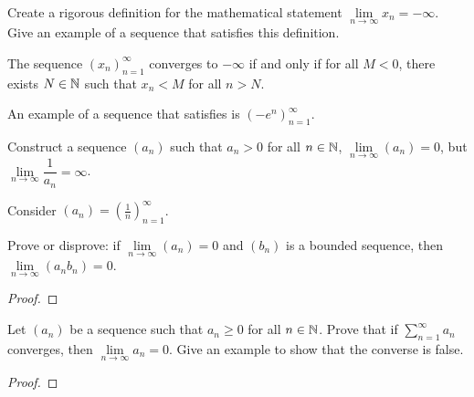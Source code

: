 \begin{problem}
  Create a rigorous definition for the mathematical statement 
  $\lim\limits_{n \to \infty} x_{n} = -\infty$. Give an example of a 
  sequence that satisfies this definition. 

    \begin{definition}
      \label{def:convergence-to-neg-infty}
      The sequence $(x_{n})_{n=1}^{\infty}$ converges to $-\infty$ if and only if
      for all $M < 0$, there exists $N \in \mathbb{N}$ such that $x_{n} < M$ 
      for all $n > N$.
    \end{definition}

    An example of a sequence that satisfies  is
    $(-e^{n})_{n=1}^{\infty}$.
\end{problem}

\begin{problem}
  Construct a sequence $(a_{n})$ such that $a_{n} > 0$ for all $n \in \mathbb{N}$,
  $\lim\limits_{n \to \infty} (a_{n}) = 0$, but
  $\lim\limits_{n \to \infty} \dfrac{1}{a_{n}} = \infty$.

  \vspace{\baselineskip}

    Consider $(a_{n}) = \left( \frac{1}{n} \right)_{n=1}^{\infty}$.

\end{problem}

\begin{problem}
  Prove or disprove: if $\lim\limits_{n \to \infty} (a_{n}) = 0$ and $(b_{n})$ is
  a bounded sequence, then $\lim\limits_{n \to \infty} (a_{n}b_{n}) = 0$.

  \begin{proof} 
  \end{proof}

\end{problem}


\begin{problem}
  Let $(a_{n})$ be a sequence such that $a_{n} \geq 0$ for all $n \in \mathbb{N}$. 
  Prove that if $\sum\limits_{n=1}^{\infty} a_{n}$ converges, then
  $\lim\limits_{n \to \infty} a_{n} = 0$. Give an example to show that the 
  converse is false.

  \begin{proof} 
  \end{proof}

\end{problem}

